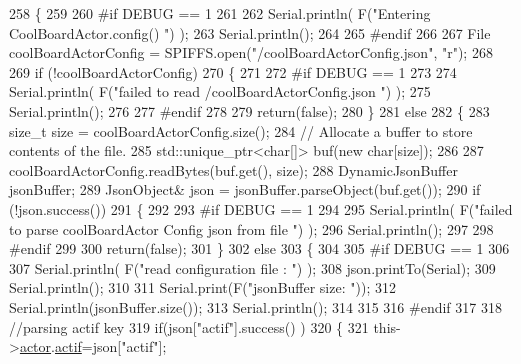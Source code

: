 \begin{DoxyCode}
258 \{
259 
260 \textcolor{preprocessor}{#if DEBUG == 1 }
261 
262     Serial.println( F(\textcolor{stringliteral}{"Entering CoolBoardActor.config() "}) );
263     Serial.println();
264 
265 \textcolor{preprocessor}{#endif}
266 
267     File coolBoardActorConfig = SPIFFS.open(\textcolor{stringliteral}{"/coolBoardActorConfig.json"}, \textcolor{stringliteral}{"r"});
268 
269     \textcolor{keywordflow}{if} (!coolBoardActorConfig) 
270     \{
271 
272 \textcolor{preprocessor}{    #if DEBUG == 1 }
273 
274         Serial.println( F(\textcolor{stringliteral}{"failed to read /coolBoardActorConfig.json "}) );
275         Serial.println();
276 
277 \textcolor{preprocessor}{    #endif}
278 
279         \textcolor{keywordflow}{return}(\textcolor{keyword}{false});
280     \}
281     \textcolor{keywordflow}{else}
282     \{
283         \textcolor{keywordtype}{size\_t} size = coolBoardActorConfig.size();
284         \textcolor{comment}{// Allocate a buffer to store contents of the file.}
285         std::unique\_ptr<char[]> buf(\textcolor{keyword}{new} \textcolor{keywordtype}{char}[size]);
286 
287         coolBoardActorConfig.readBytes(buf.get(), size);
288         DynamicJsonBuffer jsonBuffer;
289         JsonObject& json = jsonBuffer.parseObject(buf.get());
290         \textcolor{keywordflow}{if} (!json.success()) 
291         \{
292         
293 \textcolor{preprocessor}{        #if DEBUG == 1 }
294 
295             Serial.println( F(\textcolor{stringliteral}{"failed to parse coolBoardActor Config  json from file "}) );
296             Serial.println();
297 
298 \textcolor{preprocessor}{        #endif}
299 
300             \textcolor{keywordflow}{return}(\textcolor{keyword}{false});
301         \} 
302         \textcolor{keywordflow}{else}
303         \{ 
304         
305 \textcolor{preprocessor}{        #if DEBUG == 1 }
306 
307             Serial.println( F(\textcolor{stringliteral}{"read configuration file : "}) );
308             json.printTo(Serial);
309             Serial.println();
310 
311             Serial.print(F(\textcolor{stringliteral}{"jsonBuffer size: "}));
312             Serial.println(jsonBuffer.size());
313             Serial.println();
314 
315         
316 \textcolor{preprocessor}{        #endif}
317   
318             \textcolor{comment}{//parsing actif key}
319             \textcolor{keywordflow}{if}(json[\textcolor{stringliteral}{"actif"}].success() )
320             \{
321                 this->\hyperlink{class_cool_board_actor_a8f190db9f7a39fddbcef7f152da970e9}{actor}.\hyperlink{struct_cool_board_actor_1_1state_a7963178c2de01ef0d2861f9f59ad6f3c}{actif}=json[\textcolor{stringliteral}{"actif"}];

\end{DoxyCode}
